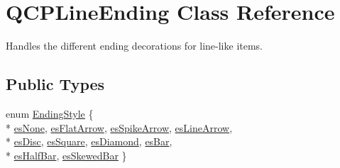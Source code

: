 \hypertarget{class_q_c_p_line_ending}{}\section{Q\+C\+P\+Line\+Ending Class Reference}
\label{class_q_c_p_line_ending}


Handles the different ending decorations for line-\/like items.  


\subsection*{Public Types}
\begin{DoxyCompactItemize}
\item 
enum \hyperlink{class_q_c_p_line_ending_a5ef16e6876b4b74959c7261d8d4c2cd5}{Ending\+Style} \{ \\*
\hyperlink{class_q_c_p_line_ending_a5ef16e6876b4b74959c7261d8d4c2cd5aca12d500f50cd6871766801bac30fb03}{es\+None}, 
\hyperlink{class_q_c_p_line_ending_a5ef16e6876b4b74959c7261d8d4c2cd5a3d7dcea2f100671727c3417142154f8f}{es\+Flat\+Arrow}, 
\hyperlink{class_q_c_p_line_ending_a5ef16e6876b4b74959c7261d8d4c2cd5ab9964d0d03f812d1e79de15edbeb2cbf}{es\+Spike\+Arrow}, 
\hyperlink{class_q_c_p_line_ending_a5ef16e6876b4b74959c7261d8d4c2cd5a61f78ee8f375fb21cb9d250687bbcbd2}{es\+Line\+Arrow}, 
\\*
\hyperlink{class_q_c_p_line_ending_a5ef16e6876b4b74959c7261d8d4c2cd5ae5a3414916817258bcc6dddd605e8f5c}{es\+Disc}, 
\hyperlink{class_q_c_p_line_ending_a5ef16e6876b4b74959c7261d8d4c2cd5ae1836502fa43d8990bb62b2d493a140a}{es\+Square}, 
\hyperlink{class_q_c_p_line_ending_a5ef16e6876b4b74959c7261d8d4c2cd5a378fe5a8b768411b0bc1765210fe7200}{es\+Diamond}, 
\hyperlink{class_q_c_p_line_ending_a5ef16e6876b4b74959c7261d8d4c2cd5a2cf543bbca332df26d89bf779f50469f}{es\+Bar}, 
\\*
\hyperlink{class_q_c_p_line_ending_a5ef16e6876b4b74959c7261d8d4c2cd5a126c390f0c359fcd8df1fc5e38d26d5b}{es\+Half\+Bar}, 
\hyperlink{class_q_c_p_line_ending_a5ef16e6876b4b74959c7261d8d4c2cd5a2b2cc96e757ca9bcd91fb70221ed43ab}{es\+Skewed\+Bar}
 \}
\end{DoxyCompactItemize}
